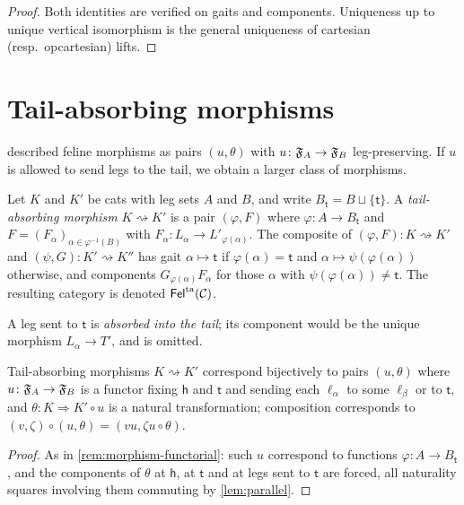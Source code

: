 \begin{proof}
Both identities are verified on gaits and components. Uniqueness up to
unique vertical isomorphism is the general uniqueness of cartesian (resp.\
opcartesian) lifts.
\end{proof}

\section{Tail-absorbing morphisms}\label{sec:tail-absorbing}

 described feline morphisms as pairs $(u,\theta)$
with $u\colon\mathfrak{F}_A\to\mathfrak{F}_B$ leg-preserving. If $u$ is allowed to send legs to
the tail, we obtain a larger class of morphisms.

\begin{definition}\label{def:tail-absorbing}
Let $K$ and $K'$ be cats with leg sets $A$ and $B$, and write
$B_{\mathsf t}=B\sqcup\{\mathsf t\}$. A \emph{tail-absorbing morphism}
$K\rightsquigarrow K'$ is a pair $(\varphi,F)$ where $\varphi\colon A\to B_{\mathsf t}$ and
$F=(F_\alpha)_{\alpha\in\varphi^{-1}(B)}$ with $F_\alpha\colon L_\alpha\to L'_{\varphi(\alpha)}$.
The composite of $(\varphi,F)\colon K\rightsquigarrow K'$ and
$(\psi,G)\colon K'\rightsquigarrow K''$ has gait
$\alpha\mapsto\mathsf t$ if $\varphi(\alpha)=\mathsf t$ and $\alpha\mapsto\psi(\varphi(\alpha))$
otherwise, and components $G_{\varphi(\alpha)}F_\alpha$ for those $\alpha$ with
$\psi(\varphi(\alpha))\neq\mathsf t$. The resulting category is
denoted $\mathsf{Fel}^{\mathrm{ta}}(\mathcal{C})$.
\end{definition}

A leg sent to $\mathsf t$ is \emph{absorbed into the tail}; its component would
be the unique morphism $L_\alpha\to T'$, and is omitted.

\begin{proposition}\label{prop:tail-absorbing-functorial}
Tail-absorbing morphisms $K\rightsquigarrow K'$ correspond bijectively to pairs
$(u,\theta)$ where $u\colon\mathfrak{F}_A\to\mathfrak{F}_B$ is a functor fixing $\mathsf h$ and
$\mathsf t$ and sending each $\ell_\alpha$ to some $\ell_\beta$ or to $\mathsf t$,
and $\theta\colon K\Rightarrow K'\circ u$ is a natural transformation; composition
corresponds to $(v,\zeta)\circ(u,\theta)=(vu,\zeta u\circ\theta)$.
\end{proposition}

\begin{proof}
As in \cref{rem:morphism-functorial}: such $u$ correspond to functions
$\varphi\colon A\to B_{\mathsf t}$, and the components of $\theta$ at $\mathsf h$,
at $\mathsf t$ and at legs sent to $\mathsf t$ are forced, all naturality
squares involving them commuting by \cref{lem:parallel}.
\end{proof}


